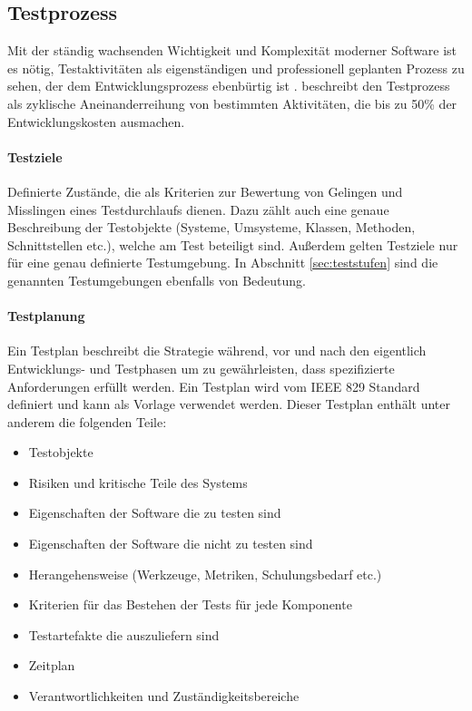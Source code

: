 \subsection{Testprozess}
Mit der ständig wachsenden Wichtigkeit und Komplexität moderner Software ist es nötig, Testaktivitäten als eigenständigen und professionell geplanten Prozess zu sehen, der dem Entwicklungsprozess ebenbürtig ist \cite{grechenig_softwaretechnik:_2010}. \citeauthor{grechenig_softwaretechnik:_2010} beschreibt den Testprozess als zyklische Aneinanderreihung von bestimmten Aktivitäten, die bis zu 50\% der Entwicklungskosten ausmachen.

\paragraph{Testziele} Definierte Zustände, die als Kriterien zur Bewertung von Gelingen und Misslingen eines Testdurchlaufs dienen. Dazu zählt auch eine genaue Beschreibung der Testobjekte (Systeme, Umsysteme, Klassen, Methoden, Schnittstellen etc.), welche am Test beteiligt sind. Außerdem gelten Testziele nur für eine genau definierte Testumgebung. In Abschnitt \ref{sec:teststufen}  sind die genannten Testumgebungen ebenfalls von Bedeutung.

\paragraph{Testplanung} Ein Testplan beschreibt die Strategie während, vor und nach den eigentlich Entwicklungs- und Testphasen um zu gewährleisten, dass spezifizierte Anforderungen erfüllt werden. Ein Testplan wird vom IEEE 829 \cite{_ieee_2008} Standard definiert und kann als Vorlage verwendet werden. Dieser Testplan enthält unter anderem die folgenden Teile:

\begin{itemize}
\item Testobjekte
\item Risiken und kritische Teile des Systems
\item Eigenschaften der Software die zu testen sind
\item Eigenschaften der Software die nicht zu testen sind
\item Herangehensweise (Werkzeuge, Metriken, Schulungsbedarf etc.)
\item Kriterien für das Bestehen der Tests für jede Komponente
\item Testartefakte die auszuliefern sind
\item Zeitplan
\item Verantwortlichkeiten und Zuständigkeitsbereiche
\end{itemize}

